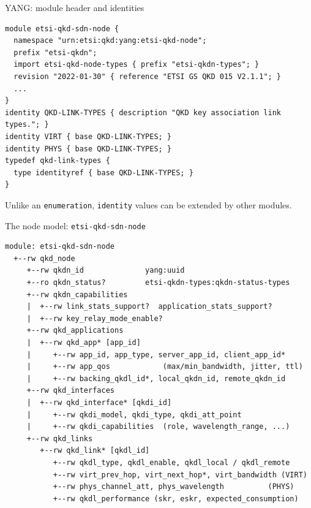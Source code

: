 \documentclass[10pt]{beamer}
\begin{document}
\begin{frame}[fragile]{YANG: module header and identities}
\begin{lstlisting}[language=yang]
module etsi-qkd-sdn-node {
  namespace "urn:etsi:qkd:yang:etsi-qkd-node";
  prefix "etsi-qkdn";
  import etsi-qkd-node-types { prefix "etsi-qkdn-types"; }
  revision "2022-01-30" { reference "ETSI GS QKD 015 V2.1.1"; }
  ...
}
identity QKD-LINK-TYPES { description "QKD key association link types."; }
identity VIRT { base QKD-LINK-TYPES; }
identity PHYS { base QKD-LINK-TYPES; }
typedef qkd-link-types {
  type identityref { base QKD-LINK-TYPES; }
}
\end{lstlisting}
  \footnotesize Unlike an \texttt{enumeration}, \texttt{identity}
      values can be extended by other modules.
\end{frame}

\begin{frame}[fragile]{The node model: \texttt{etsi-qkd-sdn-node}}
\begin{lstlisting}[basicstyle=\ttfamily\fontsize{6.8}{7.4}\selectfont]
module: etsi-qkd-sdn-node
  +--rw qkd_node
     +--rw qkdn_id              yang:uuid
     +--ro qkdn_status?         etsi-qkdn-types:qkdn-status-types
     +--rw qkdn_capabilities
     |  +--rw link_stats_support?  application_stats_support?
     |  +--rw key_relay_mode_enable?
     +--rw qkd_applications
     |  +--rw qkd_app* [app_id]
     |     +--rw app_id, app_type, server_app_id, client_app_id*
     |     +--rw app_qos            (max/min_bandwidth, jitter, ttl)
     |     +--rw backing_qkdl_id*, local_qkdn_id, remote_qkdn_id
     +--rw qkd_interfaces
     |  +--rw qkd_interface* [qkdi_id]
     |     +--rw qkdi_model, qkdi_type, qkdi_att_point
     |     +--rw qkdi_capabilities  (role, wavelength_range, ...)
     +--rw qkd_links
        +--rw qkd_link* [qkdl_id]
           +--rw qkdl_type, qkdl_enable, qkdl_local / qkdl_remote
           +--rw virt_prev_hop, virt_next_hop*, virt_bandwidth (VIRT)
           +--rw phys_channel_att, phys_wavelength          (PHYS)
           +--rw qkdl_performance (skr, eskr, expected_consumption)
\end{lstlisting}
\end{frame}
\end{document}
